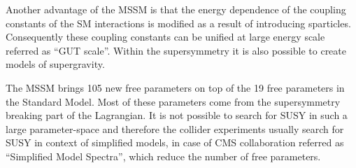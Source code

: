 

Another advantage of the MSSM is that the energy dependence of the coupling constants of the SM interactions is modified as a result of introducing sparticles. Consequently these coupling constants can be unified at large energy scale referred as ``GUT scale''. Within the supersymmetry it is also possible to create models of supergravity.



The MSSM brings 105 new free parameters on top of the 19 free parameters in the Standard Model. Most of these parameters come from the supersymmetry breaking part of the Lagrangian. It is not possible to search for SUSY in such a large parameter-space and therefore the collider experiments usually search for SUSY in context of simplified models, in case of CMS collaboration referred as ``Simplified Model Spectra'', which reduce the number of free parameters.


